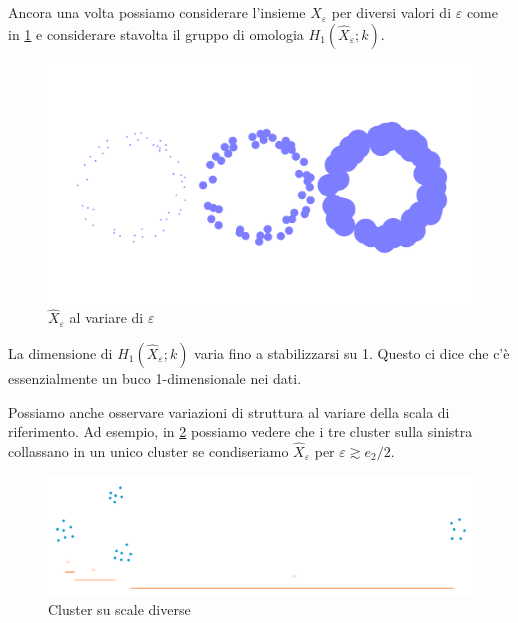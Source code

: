 Ancora una volta possiamo considerare l'insieme $\widehat{X}_\varepsilon$ per diversi valori di $\varepsilon$ come in \cref{fig:circlecomparison} e considerare stavolta il gruppo di omologia $H_{1}(\widehat{X}_\varepsilon;k)$.

\begin{figure}[h]
  \begin{center}
    \includegraphics[width=.7\paperwidth]{gfx/statistical_circle_comparison.pdf}
    \caption{$\widehat{X}_\varepsilon$ al variare di $\varepsilon$}
    \label{fig:circlecomparison}
  \end{center}
\end{figure}

La dimensione di $H_1(\widehat{X}_\varepsilon;k)$ varia fino a stabilizzarsi su 1. Questo ci dice che c'è essenzialmente un buco 1-dimensionale nei dati.

Possiamo anche osservare variazioni di struttura al variare della scala di riferimento. Ad esempio, in \cref{fig:moreclusters} possiamo vedere che i tre cluster sulla sinistra collassano in un unico cluster se condiseriamo $\widehat{X}_\varepsilon$ per $\varepsilon \gtrsim e_2/2$.

\begin{figure}[h]
  \includegraphics[width=.7\paperwidth]{gfx/more_clusters.pdf}
  \caption{Cluster su scale diverse}
  \label{fig:moreclusters}
\end{figure}

